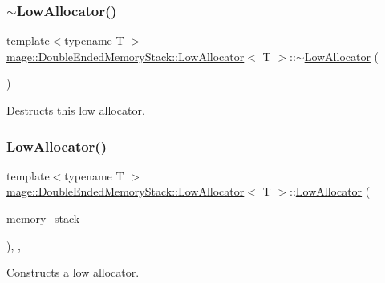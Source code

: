 \subsubsection{\texorpdfstring{$\sim$\+Low\+Allocator()}{~LowAllocator()}}
{\footnotesize\ttfamily template$<$typename T $>$ \\
\mbox{\hyperlink{classmage_1_1_double_ended_memory_stack_1_1_low_allocator}{mage\+::\+Double\+Ended\+Memory\+Stack\+::\+Low\+Allocator}}$<$ T $>$\+::$\sim$\mbox{\hyperlink{classmage_1_1_double_ended_memory_stack_1_1_low_allocator}{Low\+Allocator}} (\begin{DoxyParamCaption}{ }\end{DoxyParamCaption})\hspace{0.3cm}{\ttfamily [default]}}

Destructs this low allocator. \mbox{\label{classmage_1_1_double_ended_memory_stack_1_1_low_allocator_a4fa86a3c4e05b229f25c46e1bfa163c4}} 
\subsubsection{\texorpdfstring{Low\+Allocator()}{LowAllocator()}\hspace{0.1cm}{\footnotesize\ttfamily [4/4]}}
{\footnotesize\ttfamily template$<$typename T $>$ \\
\mbox{\hyperlink{classmage_1_1_double_ended_memory_stack_1_1_low_allocator}{mage\+::\+Double\+Ended\+Memory\+Stack\+::\+Low\+Allocator}}$<$ T $>$\+::\mbox{\hyperlink{classmage_1_1_double_ended_memory_stack_1_1_low_allocator}{Low\+Allocator}} (\begin{DoxyParamCaption}\item[{\mbox{\hyperlink{namespacemage_a8769f9d670d6b585ea306cb1062af94b}{Not\+Null}}$<$ \mbox{\hyperlink{classmage_1_1_double_ended_memory_stack}{Double\+Ended\+Memory\+Stack}} $\ast$ $>$}]{memory\+\_\+stack }\end{DoxyParamCaption})\hspace{0.3cm}{\ttfamily [explicit]}, {\ttfamily [private]}, {\ttfamily [noexcept]}}

Constructs a low allocator.


